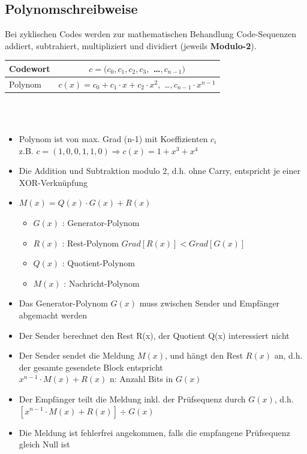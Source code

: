 \subsection{Polynomschreibweise}
Bei zyklischen Codes werden zur mathematischen Behandlung Code-Sequenzen addiert, subtrahiert, multipliziert und dividiert (jeweils \textbf{Modulo-2}).\\

\begin{tabular}{|l|c|}
\hline Codewort  & $c = (c_0, c_1, c_2, c_3,$ \dots $, c_{n-1})$ \\ 
\hline Polynom &  $c(x) = c_0 + c_1 \cdot x + c_2 \cdot x^2,$ \dots $, c_{n-1} \cdot x^{n-1}$\\ 
\hline 
\end{tabular} \\ \\

\begin{itemize}
	\item Polynom ist von max. Grad (n-1) mit Koeffizienten $c_i$\\
		z.B. $c = (1, 0, 0, 1, 1, 0) \Rightarrow c(x) = 1 + x^3 + x^4$
	\item Die Addition und Subtraktion modulo 2, d.h. ohne Carry, entspricht je einer XOR-Verknüpfung
	\item $M(x) = Q(x) \cdot G(x) + R(x)$
	\begin{itemize}
		\item $G(x)$ : Generator-Polynom
		\item $R(x)$ : Rest-Polynom \qquad $Grad[R(x)] < Grad[G(x)]$
		\item $Q(x)$ : Quotient-Polynom
		\item $M(x)$ : Nachricht-Polynom
	\end{itemize}
	\item Das Generator-Polynom $G(x)$ muss zwischen Sender und Empfänger abgemacht werden
	\item Der Sender berechnet den Rest R(x), der Quotient Q(x) interessiert nicht
	\item Der Sender sendet die Meldung $M(x)$, und hängt den Rest $R(x)$ an, d.h. der gesamte gesendete Block entspricht\\
		$x^{n-1} \cdot M(x) + R(x)$ \qquad	n: Anzahl Bits in $G(x)$
	\item Der Empfänger teilt die Meldung inkl. der Prüfsequenz durch $G(x)$, d.h.
		$[x^{n-1} \cdot M(x) + R(x)] \div G(x)$
	\item Die Meldung ist fehlerfrei angekommen, falls die empfangene Prüfsequenz gleich Null ist
\end{itemize}

